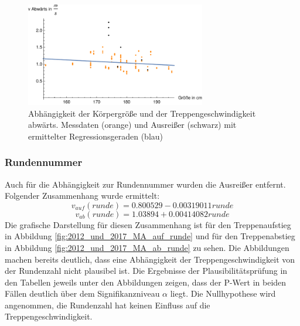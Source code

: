 \begin{figure}[htpb]
	\centering
	\includegraphics[width=0.7\textwidth]{abbildungen/regression/2012_2017_verbund/ohneausreisser/ab-groesse.pdf}
	
	\caption{Abhängigkeit der Körpergröße und der Treppengeschwindigkeit abwärts. Messdaten (orange) und Ausreißer (schwarz) mit ermittelter Regressionsgeraden (blau)}
	\label{fig:2012_und_2017_MA_ab_groesse}
\end{figure}




















\subsubsection{Rundennummer}
Auch für die Abhängigkeit zur Rundennummer wurden die Ausreißer entfernt. Folgender Zusammenhang wurde ermittelt:
\begin{equation}
v_{auf}(runde) = 0.800529 -0.00319011 runde
\label{eq:2012_2017_AufRunde_MA}
\end{equation}
\begin{equation}
v_{ab}(runde) = 1.03894 + 0.00414082 runde
\label{eq:2012_2017_AbRunde_MA}
\end{equation}
Die grafische Darstellung für diesen Zusammenhang ist für den Treppenaufstieg in Abbildung \ref{fig:2012_und_2017_MA_auf_runde} und für den Treppenabstieg in Abbildung \ref{fig:2012_und_2017_MA_ab_runde} zu sehen. Die Abbildungen machen bereits deutlich, dass eine Abhängigkeit der Treppengeschwindigkeit von der Rundenzahl nicht plausibel ist. Die Ergebnisse der Plausibilitätsprüfung in den Tabellen jeweils unter den Abbildungen zeigen, dass der P-Wert in beiden Fällen deutlich über dem Signifikanzniveau $\alpha$ liegt. Die Nullhypothese wird angenommen, die Rundenzahl hat keinen Einfluss auf die Treppengeschwindigkeit.











